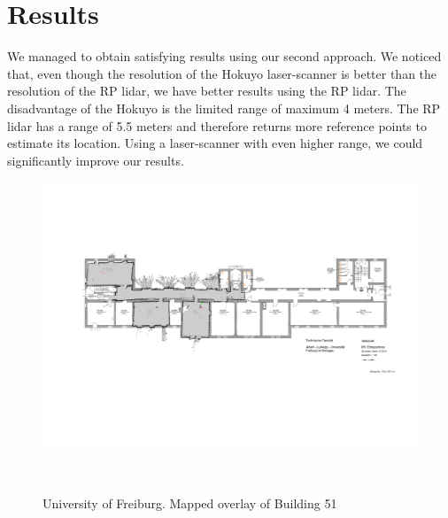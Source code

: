 \documentclass{sigchi-ext}
\begin{document}
\section{Results}
We managed to obtain satisfying results using our second approach. We noticed that, even though the resolution of the Hokuyo laser-scanner is better than the resolution of the RP lidar, we have better results using the RP lidar. The disadvantage of the Hokuyo is the limited range of maximum 4 meters. The RP lidar has a range of 5.5 meters and therefore returns more reference points to estimate its location. Using a laser-scanner with even higher range, we could significantly improve our results.
\begin{figure}
	\includegraphics[width=0.9\columnwidth]{51.png}
	\caption{University of Freiburg. Mapped overlay of Building 51}~\label{fig:sample}
\end{figure}
%
%

\balance{} 
\end{document}
